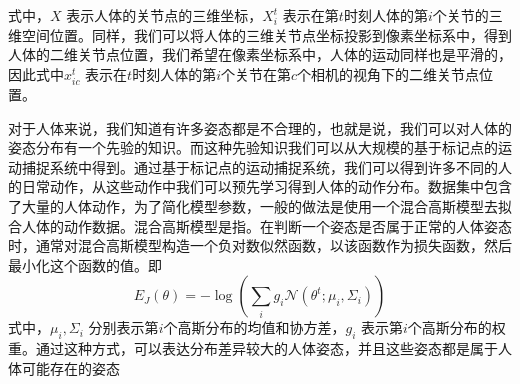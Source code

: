 式中，$X$ 表示人体的关节点的三维坐标，$X_i^t$ 表示在第$t$时刻人体的第$i$个关节的三维空间位置。同样，我们可以将人体的三维关节点坐标投影到像素坐标系中，得到人体的二维关节点位置，我们希望在像素坐标系中，人体的运动同样也是平滑的，因此式中$x_{ic}^t$ 表示在$t$时刻人体的第$i$个关节在第$c$个相机的视角下的二维关节点位置。

对于人体来说，我们知道有许多姿态都是不合理的，也就是说，我们可以对人体的姿态分布有一个先验的知识。而这种先验知识我们可以从大规模的基于标记点的运动捕捉系统中得到。通过基于标记点的运动捕捉系统，我们可以得到许多不同的人的日常动作，从这些动作中我们可以预先学习得到人体的动作分布。\cite{mocap}数据集中包含了大量的人体动作，为了简化模型参数，一般的做法是使用一个混合高斯模型去\cite{我也不知道哪篇}拟合人体的动作数据。混合高斯模型是指。在判断一个姿态是否属于正常的人体姿态时，通常对混合高斯模型构造一个负对数似然函数，以该函数作为损失函数，然后最小化这个函数的值。即
$$
    E _ { J } ( \theta ) = - \log \left( \sum _ { i } g _ { i } \mathcal { N } \left( \theta ^ { t } ; \mu _ { i } , \Sigma _ { i } \right) \right)
$$
式中，$\mu_i, \Sigma_i$ 分别表示第$i$个高斯分布的均值和协方差，$g_i$ 表示第$i$个高斯分布的权重。通过这种方式，可以表达分布差异较大的人体姿态，并且这些姿态都是属于人体可能存在的姿态